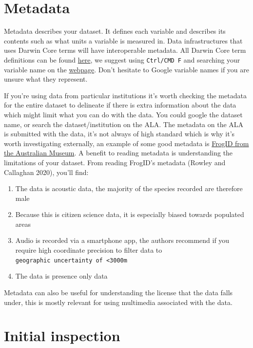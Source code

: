 \documentclass[
  letterpaper,
  DIV=11,
  numbers=noendperiod,
  oneside]{scrreprt}
\providecommand{\tightlist}{%
  \setlength{\itemsep}{0pt}\setlength{\parskip}{0pt}}\usepackage{longtable,booktabs,array}
\begin{document}
\hypertarget{metadata}{%
\section{Metadata}\label{metadata}}

Metadata describes your dataset. It defines each variable and describes
its contents such as what units a variable is measured in. Data
infrastructures that uses Darwin Core terms will have interoperable
metadata. All Darwin Core term definitions can be found
\href{https://dwc.tdwg.org/terms/}{here}, we suggest using
\texttt{Ctrl/CMD\ F} and searching your variable name on the
\href{https://dwc.tdwg.org/terms/}{webpage}. Don't hesitate to Google
variable names if you are unsure what they represent.

If you're using data from particular institutions it's worth checking
the metadata for the entire dataset to delineate if there is extra
information about the data which might limit what you can do with the
data. You could google the dataset name, or search the
dataset/institution on the ALA. The metadata on the ALA is submitted
with the data, it's not always of high standard which is why it's worth
investigating externally, an example of some good metadata is
\href{https://collections.ala.org.au/public/show/dr14760}{FrogID from
the Australian Museum}. A benefit to reading metadata is understanding
the limitations of your dataset. From reading FrogID's metadata (Rowley
and Callaghan 2020), you'll find:

\begin{enumerate}
\def\labelenumi{\arabic{enumi}.}
\tightlist
\item
  The data is acoustic data, the majority of the species recorded are
  therefore male
\item
  Because this is citizen science data, it is especially biased towards
  populated areas
\item
  Audio is recorded via a smartphone app, the authors recommend if you
  require high coordinate precision to filter data to
  \texttt{geographic\ uncertainty\ of\ \textless{}3000m}
\item
  The data is presence only data
\end{enumerate}

Metadata can also be useful for understanding the license that the data
falls under, this is mostly relevant for using multimedia associated
with the data.

\hypertarget{initial-inspection}{%
\section{Initial inspection}\label{initial-inspection}}
\end{document}
